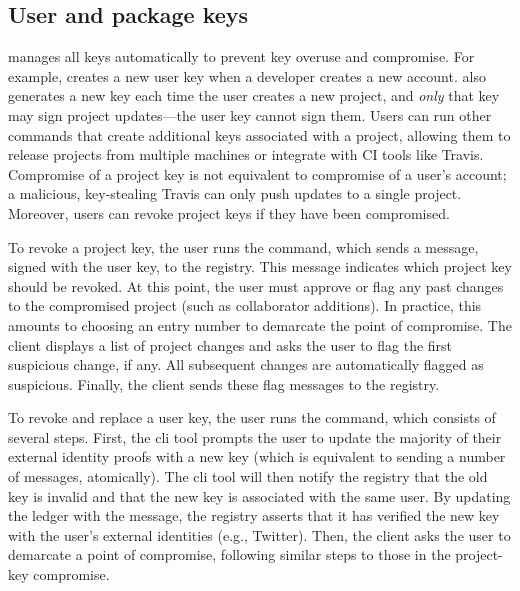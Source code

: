 
\subsection{User and package keys}
\spam{} manages all keys automatically to prevent key overuse and
compromise. For example, \spam{} creates a new user key
when a developer creates a new account. \spam{} also
generates a new key each time the user creates a new project, and \emph{only}
that key may sign project updates---the user key cannot sign them.
Users can run other \spam{} commands that create additional keys
associated with a project, allowing them to release projects from multiple
machines or integrate with CI tools like Travis. Compromise of a project key is not equivalent to
compromise of a user's account; a malicious, key-stealing Travis can
only push updates to a single project. Moreover, users can revoke
project keys if they have been compromised.

To revoke a project key, the user runs the \revokeprojkeycmd{} command, which
sends a message, signed with the user key, to the registry. This message
indicates which project key should be revoked. At this point, the user
must approve or flag any past changes to the compromised project
(such as collaborator additions). In practice, this amounts to choosing an
entry number to demarcate the point of compromise. The \spam{} client
displays a list of project changes and asks the user to flag the first
suspicious change, if any. All subsequent changes are
automatically flagged as suspicious. Finally, the \spam client sends
these flag messages to the registry.

To revoke and replace a user key, the user runs the \replaceuserkeycmd{} command, which
consists of several steps. First, the cli tool prompts the user to update
the majority of their external identity proofs with a new key (which is equivalent to
sending a number of \proveidentity messages, atomically). The cli tool
will then notify the registry that the old key is invalid and that the new key is associated
with the same user. By updating the ledger with the \replaceuserkey{} message, the
registry asserts that it has verified the new key with the user's external identities
(e.g., Twitter). Then, the \spam client asks the user to demarcate
a point of compromise, following similar steps to those in the project-key
compromise. 

